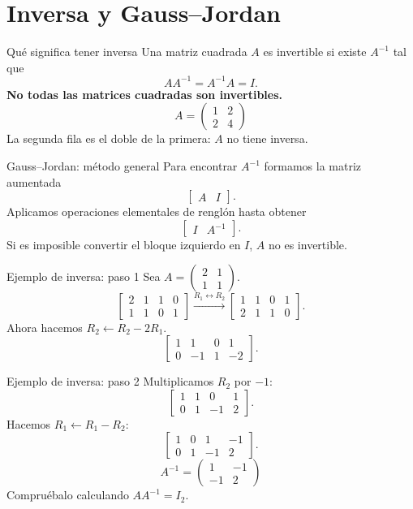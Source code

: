 \documentclass[aspectratio=169,11pt]{beamer}
\begin{document}
\section{Inversa y Gauss--Jordan}
\begin{frame}{Qué significa tener inversa}
Una matriz cuadrada $A$ es invertible si existe $A^{-1}$ tal que
\[AA^{-1}=A^{-1}A=I.\]
\textbf{No todas las matrices cuadradas son invertibles.}
\[A=\begin{pmatrix}1&2\\2&4\end{pmatrix}\]
La segunda fila es el doble de la primera: $A$ no tiene inversa.
\end{frame}
\begin{frame}{Gauss--Jordan: método general}
Para encontrar $A^{-1}$ formamos la matriz aumentada
\[\left[\begin{array}{c|c}A&I\end{array}\right].\]
Aplicamos operaciones elementales de renglón hasta obtener
\[\left[\begin{array}{c|c}I&A^{-1}\end{array}\right].\]
Si es imposible convertir el bloque izquierdo en $I$, $A$ no es invertible.
\end{frame}
\begin{frame}{Ejemplo de inversa: paso 1}
Sea $A=\begin{pmatrix}2&1\\1&1\end{pmatrix}$.
\[\left[\begin{array}{cc|cc}2&1&1&0\\1&1&0&1\end{array}\right]\xrightarrow{R_1\leftrightarrow R_2}\left[\begin{array}{cc|cc}1&1&0&1\\2&1&1&0\end{array}\right].\]
Ahora hacemos $R_2\leftarrow R_2-2R_1$.
\[\left[\begin{array}{cc|cc}1&1&0&1\\0&-1&1&-2\end{array}\right].\]
\end{frame}
\begin{frame}{Ejemplo de inversa: paso 2}
Multiplicamos $R_2$ por $-1$:
\[\left[\begin{array}{cc|cc}1&1&0&1\\0&1&-1&2\end{array}\right].\]
Hacemos $R_1\leftarrow R_1-R_2$:
\[\left[\begin{array}{cc|cc}1&0&1&-1\\0&1&-1&2\end{array}\right].\]
\[\boxed{A^{-1}=\begin{pmatrix}1&-1\\-1&2\end{pmatrix}}\]
Compruébalo calculando $AA^{-1}=I_2$.
\end{frame}
\end{document}
